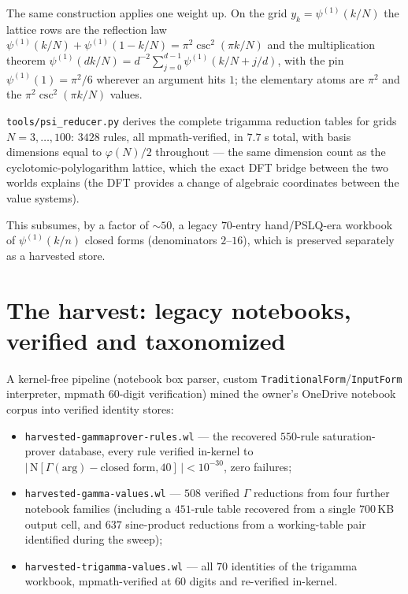 The same construction applies one weight up. On the grid $y_k=\psi^{(1)}(k/N)$ the lattice
rows are the reflection law
$\psi^{(1)}(k/N)+\psi^{(1)}(1-k/N)=\pi^2\csc^2(\pi k/N)$
and the multiplication theorem
$\psi^{(1)}(dk/N)=d^{-2}\sum_{j=0}^{d-1}\psi^{(1)}(k/N+j/d)$,
with the pin $\psi^{(1)}(1)=\pi^2/6$ wherever an argument hits $1$; the elementary atoms
are $\pi^2$ and the $\pi^2\csc^2(\pi k/N)$ values.

\begin{result}\label{gamma:res:psicensus}
\texttt{tools/psi\_reducer.py} derives the complete trigamma reduction tables for grids
$N=3,\dots,100$: $3428$ rules, all mpmath-verified, in $7.7$ s total, with basis
dimensions equal to $\varphi(N)/2$ throughout --- the same dimension count as the
cyclotomic-polylogarithm lattice, which the exact DFT bridge between the two worlds
explains (the DFT provides a change of algebraic coordinates between the value systems).
\end{result}

This subsumes, by a factor of ${\sim}50$, a legacy $70$-entry hand/PSLQ-era workbook of
$\psi^{(1)}(k/n)$ closed forms (denominators $2$--$16$), which is preserved separately as a
harvested store.

\section{The harvest: legacy notebooks, verified and taxonomized}\label{gamma:sec:harvest}

A kernel-free pipeline (notebook box parser, custom
\texttt{TraditionalForm}/\texttt{InputForm} interpreter, mpmath $60$-digit verification)
mined the owner's OneDrive notebook corpus into verified identity stores:

\begin{itemize}
\item \texttt{harvested-gammaprover-rules.wl} --- the recovered $550$-rule saturation-prover
database, every rule verified in-kernel to $|\,\mathrm{N}[\Gamma(\text{arg})-\text{closed
form},40]\,|<10^{-30}$, zero failures;
\item \texttt{harvested-gamma-values.wl} --- $508$ verified $\Gamma$ reductions from four
further notebook families (including a $451$-rule table recovered from a single $700$\,KB
output cell, and $637$ sine-product reductions from a working-table pair identified during
the sweep);
\item \texttt{harvested-trigamma-values.wl} --- all $70$ identities of the trigamma
workbook, mpmath-verified at $60$ digits and re-verified in-kernel.
\end{itemize}

